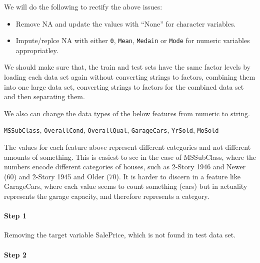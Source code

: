 \documentclass[]{article}
\newenvironment{Shaded}{\begin{snugshade}}{\end{snugshade}}
\newcommand{\StringTok}[1]{\textcolor[rgb]{0.31,0.60,0.02}{#1}}
\newcommand{\OtherTok}[1]{\textcolor[rgb]{0.56,0.35,0.01}{#1}}
\newcommand{\OperatorTok}[1]{\textcolor[rgb]{0.81,0.36,0.00}{\textbf{#1}}}
\newcommand{\NormalTok}[1]{#1}
\providecommand{\tightlist}{%
  \setlength{\itemsep}{0pt}\setlength{\parskip}{0pt}}
\let\oldparagraph\paragraph
\renewcommand{\paragraph}[1]{\oldparagraph{#1}\mbox{}}
\begin{document}
We will do the following to rectify the above issues:

\begin{itemize}
\tightlist
\item
  Remove NA and update the values with ``None'' for character variables.
\item
  Impute/replce NA with either \texttt{0}, \texttt{Mean},
  \texttt{Medain} or \texttt{Mode} for numeric variables appropriatley.
\end{itemize}

We should make sure that, the train and test sets have the same factor
levels by loading each data set again without converting strings to
factors, combining them into one large data set, converting strings to
factors for the combined data set and then separating them.

We also can change the data types of the below features from numeric to
string.

\texttt{MSSubClass}, \texttt{OverallCond}, \texttt{OverallQual},
\texttt{GarageCars}, \texttt{YrSold}, \texttt{MoSold}

The values for each feature above represent different categories and not
different amounts of something. This is easiest to see in the case of
MSSubClass, where the numbers encode different categories of houses,
such as 2-Story 1946 and Newer (60) and 2-Story 1945 and Older (70). It
is harder to discern in a feature like GarageCars, where each value
seems to count something (cars) but in actuality represents the garage
capacity, and therefore represents a category.

\paragraph{Step 1}\label{step-1}

Removing the target variable SalePrice, which is not found in test data
set.

\begin{Shaded}
\end{Shaded}

\paragraph{Step 2}\label{step-2}
\end{document}
